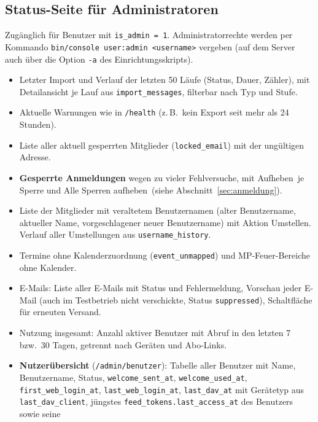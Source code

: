 \documentclass[a4paper,fontsize=10pt]{scrartcl}
\newcommand{\code}[1]{\texttt{#1}}
\begin{document}
\subsection{Status-Seite für Administratoren}

Zugänglich für Benutzer mit \code{is\_admin = 1}. Administratorrechte werden
per Kommando \code{bin/console user:admin <username>} vergeben (auf dem
Server auch über die Option \code{-a} des Einrichtungsskripts).

\begin{itemize}
  \item Letzter Import und Verlauf der letzten 50 Läufe (Status, Dauer,
        Zähler), mit Detailansicht je Lauf aus \code{import\_messages},
        filterbar nach Typ und Stufe.
  \item Aktuelle Warnungen wie in \code{/health} (z.\,B.\ kein Export seit
        mehr als 24 Stunden).
  \item Liste aller aktuell gesperrten Mitglieder (\code{locked\_email}) mit
        der ungültigen Adresse.
  \item \textbf{Gesperrte Anmeldungen} wegen zu vieler Fehlversuche, mit
        \glqq Aufheben\grqq\ je Sperre und \glqq Alle Sperren aufheben\grqq\
        (siehe Abschnitt~\ref{sec:anmeldung}).
  \item Liste der Mitglieder mit veraltetem Benutzernamen (alter
        Benutzername, aktueller Name, vorgeschlagener neuer Benutzername)
        mit Aktion \glqq Umstellen\grqq. Verlauf aller Umstellungen aus
        \code{username\_history}.
  \item Termine ohne Kalenderzuordnung (\code{event\_unmapped}) und
        MP-Feuer-Bereiche ohne Kalender.
  \item E-Mails: Liste aller E-Mails mit Status und Fehlermeldung,
        Vorschau jeder E-Mail (auch im Testbetrieb nicht verschickte,
        Status \code{suppressed}), Schaltfläche für erneuten Versand.
  \item Nutzung insgesamt: Anzahl aktiver Benutzer mit Abruf in den letzten
        7 bzw.\ 30 Tagen, getrennt nach Geräten und Abo-Links.
  \item \textbf{Nutzerübersicht} (\code{/admin/benutzer}): Tabelle aller
        Benutzer mit Name, Benutzername, Status, \code{welcome\_sent\_at},
        \code{welcome\_used\_at}, \code{first\_web\_login\_at},
        \code{last\_web\_login\_at}, \code{last\_dav\_at} mit Gerätetyp
        aus \code{last\_dav\_client}, jüngstes
        \code{feed\_tokens.last\_access\_at} des Benutzers sowie seine

\end{itemize}
\end{document}
